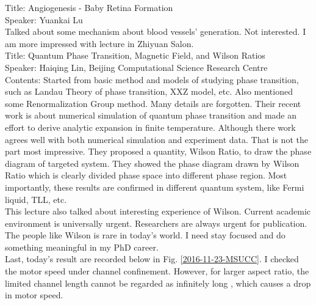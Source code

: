 \documentclass[fontsize=11pt, %
                             paper=a4, %
                             twoside, %
                             captions=tableheading,
                             index=totoc,
                             hyperref]{labbook}
\begin{document}
\begin{addmargin}[4cm]{0cm}
Title: Angiogenesis - Baby Retina Formation\\
Speaker: Yuankai Lu\\
Talked about some mechanism about blood vessels' generation. Not interested. I am more impressed with lecture in Zhiyuan Salon.\\
Title: Quantum Phase Transition, Magnetic Field, and Wilson Ratios\\
Speaker: Haiqing Lin, Beijing Computational Science Research Centre\\
Contents: Started from basic method and models of studying phase transition, such as Landau Theory of phase transition, XXZ model, etc. Also mentioned some Renormalization Group method. Many details are forgotten. Their recent work is about numerical simulation of quantum phase transition and made an effort to derive analytic expansion in finite temperature. Although there work agrees well with both numerical simulation and experiment data. That is not the part most impressive. They proposed a quantity, Wilson Ratio, to draw the phase diagram of targeted system. They showed the phase diagram drawn by Wilson Ratio which is clearly divided phase space into different phase region. Most importantly, these results are confirmed in different quantum system, like Fermi liquid, TLL, etc. \\
This lecture also talked about interesting experience of Wilson. Current academic environment is universally urgent. Researchers are always urgent for publication. The people like Wilson is rare in today's world. I need stay focused and do something meaningful in my PhD career.\\

Last, today's result are recorded below in Fig. \ref{2016-11-23-MSUCC}. I checked the motor speed under channel confinement. However, for larger aspect ratio, the limited channel length cannot be regarded as infinitely long , which causes a drop in motor speed.


\end{addmargin}
\end{document}
